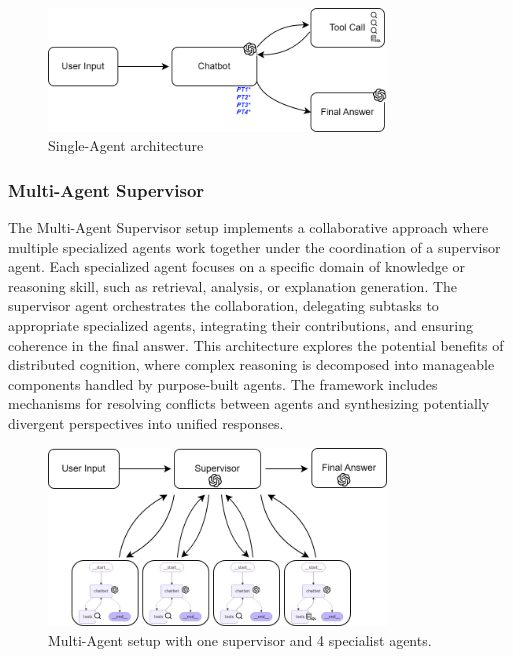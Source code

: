                 \begin{figure}[h]
                    \centering
                    \includegraphics[width=0.8\textwidth]{images_exp2/diagrama_single_agent.png}
                    \caption{Single-Agent architecture}
                    \label{fig:diagrama_single_agent}
                \end{figure}


            \subsubsection{Multi-Agent Supervisor}

                The Multi-Agent Supervisor setup implements a collaborative approach where multiple specialized agents work together under the coordination of a supervisor agent. Each specialized agent focuses on a specific domain of knowledge or reasoning skill, such as retrieval, analysis, or explanation generation. The supervisor agent orchestrates the collaboration, delegating subtasks to appropriate specialized agents, integrating their contributions, and ensuring coherence in the final answer. This architecture explores the potential benefits of distributed cognition, where complex reasoning is decomposed into manageable components handled by purpose-built agents. The framework includes mechanisms for resolving conflicts between agents and synthesizing potentially divergent perspectives into unified responses.

                \begin{figure}[h]
                    \centering
                    \includegraphics[width=0.8\textwidth]{images_exp2/diagrama_multiagente_supervisor.png}
                    \caption{Multi-Agent setup with one supervisor and 4 specialist agents.}
                    \label{fig:diagrama_multiagente_supervisor}
                \end{figure}


